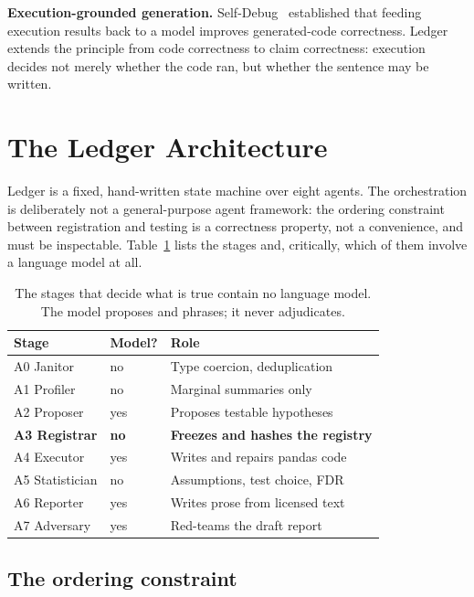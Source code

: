\documentclass[10pt,twocolumn]{article}
\newcommand{\phead}[1]{\smallskip\noindent\textbf{#1.}\hspace{0.6em}\ignorespaces}
\begin{document}
\phead{Execution-grounded generation}
Self-Debug~\cite{chen2024selfdebug} established that feeding execution results
back to a model improves generated-code correctness. Ledger extends the
principle from code correctness to claim correctness: execution decides not
merely whether the code ran, but whether the sentence may be written.

\section{The Ledger Architecture}
\label{sec:arch}

Ledger is a fixed, hand-written state machine over eight agents. The
orchestration is deliberately not a general-purpose agent framework: the
ordering constraint between registration and testing is a correctness property,
not a convenience, and must be inspectable. Table~\ref{tab:agents} lists the
stages and, critically, which of them involve a language model at all.

\begin{table}[t]
\centering\small
\begin{tabular}{@{}llp{3.1cm}@{}}
\toprule
\textbf{Stage} & \textbf{Model?} & \textbf{Role} \\
\midrule
A0 Janitor      & no  & Type coercion, deduplication \\
A1 Profiler     & no  & Marginal summaries only \\
A2 Proposer     & yes & Proposes testable hypotheses \\
\textbf{A3 Registrar} & \textbf{no} & \textbf{Freezes and hashes the registry} \\
A4 Executor     & yes & Writes and repairs pandas code \\
A5 Statistician & no  & Assumptions, test choice, FDR \\
A6 Reporter     & yes & Writes prose from licensed text \\
A7 Adversary    & yes & Red-teams the draft report \\
\bottomrule
\end{tabular}
\caption{The stages that decide what is true contain no language model. The
model proposes and phrases; it never adjudicates.}
\label{tab:agents}
\vspace{-4mm}
\end{table}

\subsection{The ordering constraint}
\end{document}
